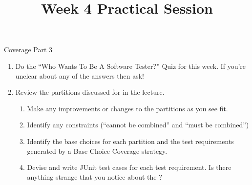 



\title{Week 4 Practical Session}{Coverage Part 3}

\begin{enumerate}

    \item Do the ``Who Wants To Be A Software Tester?'' Quiz for this week.
    If you're unclear about any of the answers then ask!

    \item Review the partitions discussed for \triangleclass in the lecture.
    
    \begin{enumerate}
        \item Make any improvements or changes to the partitions as you see fit.
        
        \item Identify any constraints (``cannot be combined'' and ``must be combined'')
        
        \item Identify the base choices for each partition and the test
        requirements generated by a Base Choice Coverage strategy.

        \item Devise and write JUnit test cases for each test requirement. Is
        there anything strange that you notice about the \triangleclass?
    \end{enumerate}
        

\end{enumerate}

